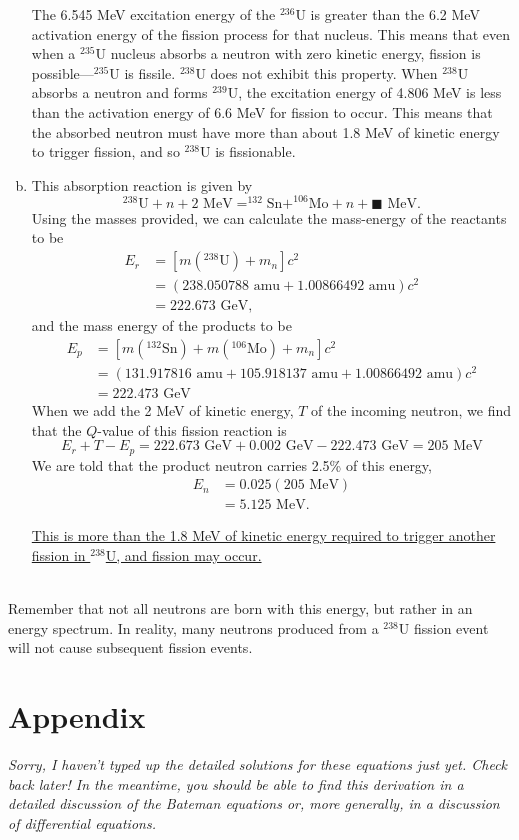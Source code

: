 \documentclass{report}
\begin{document}
\begin{enumerate}[a)]
The 6.545 MeV excitation energy of the $^{236}$U is greater than the 6.2 MeV activation energy of the fission process for that nucleus. This means that even when a $^{235}$U nucleus absorbs a neutron with zero kinetic energy, fission is possible---$^{235}$U is fissile. $^{238}$U does not exhibit this property. When $^{238}$U absorbs a neutron and forms $^{239}$U, the excitation energy of 4.806 MeV is less than the activation energy of 6.6 MeV for fission to occur. This means that the absorbed neutron must have more than about 1.8 MeV of kinetic energy to trigger fission, and so $^{238}$U is fissionable.


\item

This absorption reaction is given by
$$ ^{238}\text{U} + n + 2\text{ MeV} = ^{132}\text{Sn} + ^{106}\text{Mo} + n + \blacksquare\text{ MeV} .$$
Using the masses provided, we can calculate the mass-energy of the reactants to be
\begin{align*}
E_r	&= \left[m(^{238}\text{U}) + m_n\right]c^2 \\
	&= \left(238.050788\text{ amu} + 1.00866492\text{ amu}\right)c^2 \\
	&= 222.673\text{ GeV},
\end{align*}
and the mass energy of the products to be
\begin{align*}
E_p	&= \left[m(^{132}\text{Sn}) + m(^{106}\text{Mo}) + m_n\right]c^2 \\
	&= \left(131.917816\text{ amu} + 105.918137\text{ amu} + 1.00866492\text{ amu}\right)c^2 \\
	&= 222.473\text{ GeV}
\end{align*}
When we add the 2 MeV of kinetic energy, $T$ of the incoming neutron, we find that the $Q$-value of this fission reaction is
$$ E_r + T - E_p = 222.673\text{ GeV}
 + 0.002\text{ GeV} - 222.473\text{ GeV} = 205\text{ MeV} $$
We are told that the product neutron carries 2.5\% of this energy,
\begin{align*}
E_n	&= 0.025(205\text{ MeV}) \\
	&= 5.125\text{ MeV}. 
\end{align*}

\underline{This is more than the 1.8 MeV of kinetic energy required to trigger another fission in $^{238}$U, and fission may occur.}
\end{enumerate}
\-\\
{\small *Remember that not all neutrons are born with this energy, but rather in an energy spectrum. In reality, many neutrons produced from a $^{238}$U fission event will not cause subsequent fission events.} 



\newpage
\section*{Appendix}

\textit{Sorry, I haven't typed up the detailed solutions for these equations just yet. Check back later! In the meantime, you should be able to find this derivation in a detailed discussion of the Bateman equations or, more generally, in a discussion of differential equations.}
\end{document}
